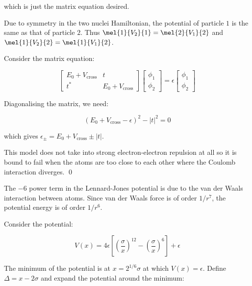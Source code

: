 \documentclass[12pt]{article}
\begin{document}
which is just the matrix equation desired.

Due to symmetry in the two nuclei Hamiltonian, the potential of particle $1$ is the same as that of particle $2$. Thus $\mel{1}{V_{2}}{1} = \mel{2}{V_{1}}{2}$ and $\mel{1}{V_{2}}{2} = \mel{1}{V_{1}}{2}$.

Consider the matrix equation:

\begin{equation}
    \begin{bmatrix}
        E_{0} + V_{\text{cross}} & t                        \\
        t^{*}                    & E_{0} + V_{\text{cross}}
    \end{bmatrix}
    \begin{bmatrix}
        \phi_{1} \\
        \phi_{2}
    \end{bmatrix}
    = \epsilon
    \begin{bmatrix}
        \phi_{1} \\
        \phi_{2}
    \end{bmatrix}
\end{equation}

Diagonalising the matrix, we need:

\begin{equation}
    (E_{0} + V_{\text{cross}} - \epsilon)^{2} - \left\lvert t \right\rvert^{2} = 0
\end{equation}

which gives $\epsilon_{\pm} = E_{0} + V_{\text{cross}} \pm \left\lvert t \right\rvert$.

This model does not take into strong electron-electron repulsion at all so it is bound to fail when the atoms are too close to each other where the Coulomb interaction diverges.
\qed



The $-6$ power term in the Lennard-Jones potential is due to the van der Waals interaction between atoms. Since van der Waals force is of order $1/r^{7}$, the potential energy is of order $1/r^{6}$.

Consider the potential:

\begin{equation}
    V(x) = 4 \epsilon \left[ \left( \frac{\sigma}{x} \right)^{12} - \left( \frac{\sigma}{x} \right)^{6} \right] + \epsilon
\end{equation}

The minimum of the potential is at $x = 2^{1/6} \sigma$ at which $V(x) = \epsilon$. Define $\Delta = x - 2\sigma$ and expand the potential around the minimum:
\end{document}
